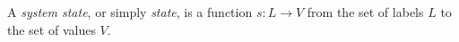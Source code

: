 \documentclass[12pt]{article}
\begin{document}
A \emph{system state}, or simply \emph{state}, is a function $s\colon L \to V$ from the set of labels $L$ to the set of values $V$. 
\end{document}
